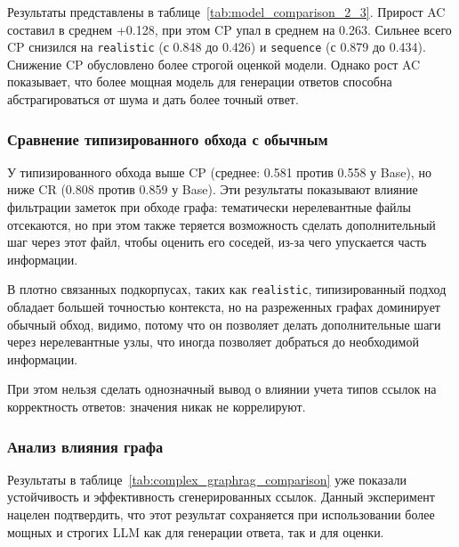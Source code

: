 Результаты представлены в таблице~\ref{tab:model_comparison_2_3}.
Прирост AC составил в среднем +0.128,
при этом CP упал в среднем на 0.263.
Сильнее всего CP снизился на \texttt{realistic} (с 0.848 до 0.426)
и \texttt{sequence} (с 0.879 до 0.434).
Снижение CP обусловлено более строгой оценкой модели.
Однако рост AC показывает, что более мощная модель
для генерации ответов способна абстрагироваться от шума
и дать более точный ответ.

\subsubsection*{Сравнение типизированного обхода с обычным}

У типизированного обхода выше CP (среднее: 0.581 против 0.558 у Base), но ниже
CR (0.808 против 0.859 у Base).
Эти результаты показывают влияние фильтрации заметок при обходе графа:
тематически нерелевантные файлы отсекаются, но при этом также теряется возможность
сделать дополнительный шаг через этот файл, чтобы оценить его соседей, из-за чего упускается часть информации.

В плотно связанных подкорпусах, таких как \texttt{realistic},
типизированный подход обладает большей точностью контекста, но
на разреженных графах доминирует обычный обход, видимо,
потому что он позволяет делать дополнительные шаги через нерелевантные узлы,
что иногда позволяет добраться до необходимой информации.

При этом нельзя сделать однозначный вывод о влиянии учета типов ссылок на корректность ответов:
значения никак не коррелируют.

\subsubsection{Анализ влияния графа}

Результаты в таблице~\ref{tab:complex_graphrag_comparison}
уже показали устойчивость и эффективность сгенерированных ссылок.
Данный эксперимент нацелен подтвердить,
что этот результат сохраняется при использовании
более мощных и строгих LLM как для генерации ответа,
так и для оценки.

